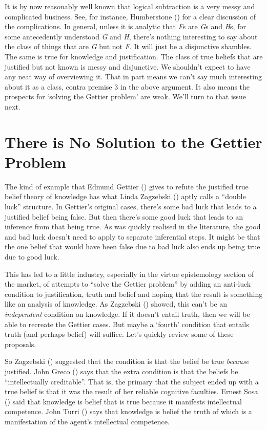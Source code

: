 \documentclass[
  11pt,
  letterpaper,
  DIV=11,
  numbers=noendperiod,
  twoside]{scrartcl}
\begin{document}
It is by now reasonably well known that logical subtraction is a very
messy and complicated business. See, for instance, Humberstone
() for a clear discussion of the
complications. In general, unless it is analytic that \emph{F}s are
\emph{G}s and \emph{H}s, for some antecedently understood \emph{G} and
\emph{H}, there's nothing interesting to say about the class of things
that are \emph{G} but not \emph{F}. It will just be a disjunctive
shambles. The same is true for knowledge and justification. The class of
true beliefs that are justified but not known is messy and disjunctive.
We shouldn't expect to have any neat way of overviewing it. That in part
means we can't say much interesting about it as a class, contra premise
3 in the above argument. It also means the prospects for `solving the
Gettier problem' are weak. We'll turn to that issue next.

\section{There is No Solution to the Gettier
Problem}\label{there-is-no-solution-to-the-gettier-problem}

The kind of example that Edmund Gettier
() gives to refute the justified true
belief theory of knowledge has what Linda Zagzebski
() aptly calls a ``double luck''
structure. In Gettier's original cases, there's some bad luck that leads
to a justified belief being false. But then there's some good luck that
leads to an inference from that being true. As was quickly realised in
the literature, the good and bad luck doesn't need to apply to separate
inferential steps. It might be that the one belief that would have been
false due to bad luck also ends up being true due to good luck.

This has led to a little industry, especially in the virtue epistemology
section of the market, of attempts to ``solve the Gettier problem'' by
adding an anti-luck condition to justification, truth and belief and
hoping that the result is something like an analysis of knowledge. As
Zagzebski () showed, this can't be an
\emph{independent} condition on knowledge. If it doesn't entail truth,
then we will be able to recreate the Gettier cases. But maybe a `fourth'
condition that entails truth (and perhaps belief) will suffice. Let's
quickly review some of these proposals.

So Zagzebski () suggested that the
condition is that the belief be true \emph{because} justified. John
Greco () says that the extra condition is
that the beliefs be ``intellectually creditable''. That is, the primary
that the subject ended up with a true belief is that it was the result
of her reliable cognitive faculties. Ernest Sosa
() said that knowledge is belief that is
true because it manifests intellectual competence. John Turri
() says that knowledge is belief the truth
of which is a manifestation of the agent's intellectual competence.
\end{document}

